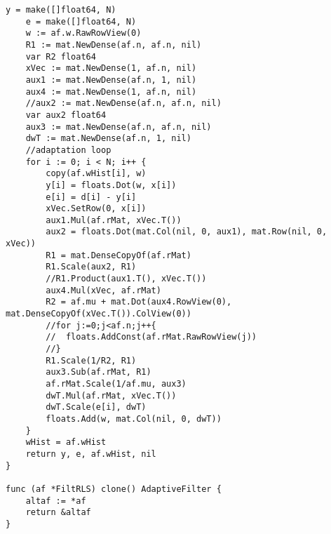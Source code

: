 \begin{lstlisting}[caption=rls.go,label=rls.go]
	y = make([]float64, N)
	e = make([]float64, N)
	w := af.w.RawRowView(0)
	R1 := mat.NewDense(af.n, af.n, nil)
	var R2 float64
	xVec := mat.NewDense(1, af.n, nil)
	aux1 := mat.NewDense(af.n, 1, nil)
	aux4 := mat.NewDense(1, af.n, nil)
	//aux2 := mat.NewDense(af.n, af.n, nil)
	var aux2 float64
	aux3 := mat.NewDense(af.n, af.n, nil)
	dwT := mat.NewDense(af.n, 1, nil)
	//adaptation loop
	for i := 0; i < N; i++ {
		copy(af.wHist[i], w)
		y[i] = floats.Dot(w, x[i])
		e[i] = d[i] - y[i]
		xVec.SetRow(0, x[i])
		aux1.Mul(af.rMat, xVec.T())
		aux2 = floats.Dot(mat.Col(nil, 0, aux1), mat.Row(nil, 0, xVec))
		R1 = mat.DenseCopyOf(af.rMat)
		R1.Scale(aux2, R1)
		//R1.Product(aux1.T(), xVec.T())
		aux4.Mul(xVec, af.rMat)
		R2 = af.mu + mat.Dot(aux4.RowView(0), mat.DenseCopyOf(xVec.T()).ColView(0))
		//for j:=0;j<af.n;j++{
		//	floats.AddConst(af.rMat.RawRowView(j))
		//}
		R1.Scale(1/R2, R1)
		aux3.Sub(af.rMat, R1)
		af.rMat.Scale(1/af.mu, aux3)
		dwT.Mul(af.rMat, xVec.T())
		dwT.Scale(e[i], dwT)
		floats.Add(w, mat.Col(nil, 0, dwT))
	}
	wHist = af.wHist
	return y, e, af.wHist, nil
}

func (af *FiltRLS) clone() AdaptiveFilter {
	altaf := *af
	return &altaf
}
\end{lstlisting}

